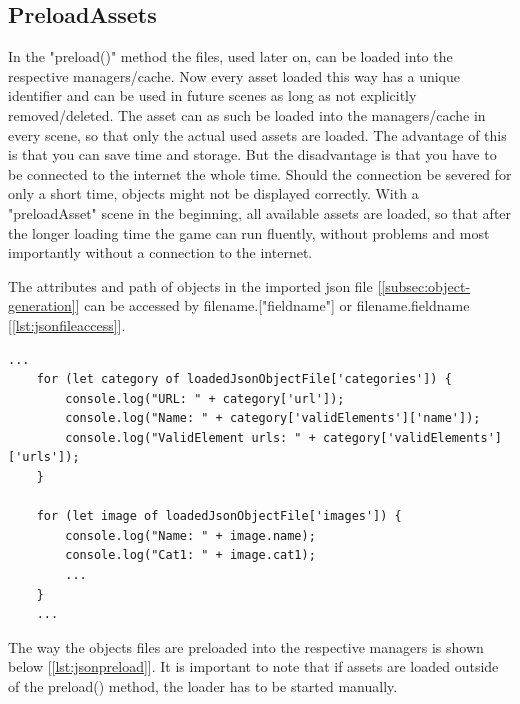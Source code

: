 \subsection{PreloadAssets}\label{subsec:preloadassets}
In the "preload()" method the files, used later on, can be loaded into the respective managers/cache.
Now every asset loaded this way has a unique identifier and can be used in future scenes
as long as not explicitly removed/deleted.
The asset can as such be loaded into the managers/cache in every scene,
so that only the actual used assets are loaded.
The advantage of this is that you can save time and storage.
But the disadvantage is that you have to be connected to the internet the whole time.
Should the connection be severed for only a short time, objects might not be displayed correctly.
With a "preloadAsset" scene in the beginning, all available assets are loaded,
so that after the longer loading time the game can run fluently,
without problems and most importantly without a connection to the internet.

The attributes and path of objects in the imported json file [\ref{subsec:object-generation}]
can be accessed by filename.["fieldname"] or filename.fieldname [\ref{lst:jsonfileaccess}].

\begin{lstlisting}[style=TypeScript, caption={Example json file access}, label={lst:jsonfileaccess}]
    ...
    for (let category of loadedJsonObjectFile['categories']) {
        console.log("URL: " + category['url']);
        console.log("Name: " + category['validElements']['name']);
        console.log("ValidElement urls: " + category['validElements']['urls']);
    }

    for (let image of loadedJsonObjectFile['images']) {
        console.log("Name: " + image.name);
        console.log("Cat1: " + image.cat1);
        ...
    }
    ...
\end{lstlisting}

The way the objects files are preloaded into the respective managers is shown below [\ref{lst:jsonpreload}].
It is important to note that if assets are loaded outside of the preload() method,
the loader has to be started manually.

